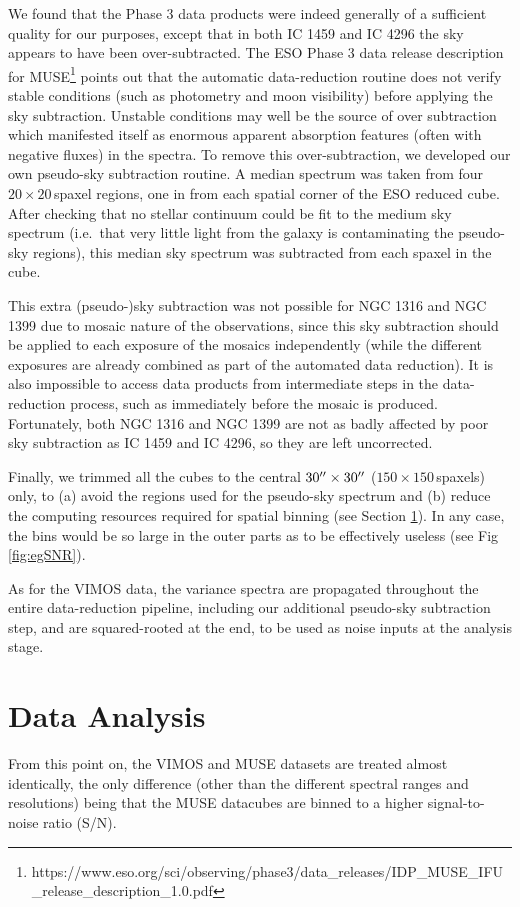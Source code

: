 		We found that the Phase 3 data products were indeed generally of a sufficient quality for our purposes, except that in both IC 1459 and IC 4296 the sky appears to have been over-subtracted. The ESO Phase 3 data release description for MUSE\footnote{https://www.eso.org/sci/observing/phase3/data_releases/IDP_MUSE_IFU_release_description_1.0.pdf} points out that the automatic data-reduction routine does not verify stable conditions (such as photometry and moon visibility) before applying the sky subtraction. Unstable conditions may well be the source of over subtraction which manifested itself as enormous apparent absorption features (often with negative fluxes) in the spectra. To remove this over-subtraction, we developed our own pseudo-sky subtraction routine. A median spectrum was taken from four $20 \times 20$\,spaxel regions, one in from each spatial corner of the ESO reduced cube. After checking that no stellar continuum could be fit to the medium sky spectrum (i.e.\ that very little light from the galaxy is contaminating the pseudo-sky regions), this median sky spectrum was subtracted from each spaxel in the cube. 

		This extra (pseudo-)sky subtraction was not possible for NGC 1316 and NGC 1399 due to mosaic nature of the observations, since this sky subtraction should be applied to each exposure of the mosaics independently (while the different exposures are already combined as part of the automated data reduction). It is also impossible to access data products from intermediate steps in the data-reduction process, such as immediately before the mosaic is produced. Fortunately, both NGC 1316 and NGC 1399 are not as badly affected by poor sky subtraction as IC 1459 and IC 4296, so they are left uncorrected. 

		Finally, we trimmed all the cubes to the central $30\hbox{$^{\prime\prime}$} \times 30\hbox{$^{\prime\prime}$}$ ($150 \times 150$\,spaxels) only, to (a) avoid the regions used for the pseudo-sky spectrum and (b) reduce the computing resources required for spatial binning (see Section \ref{sec:analysis}). In any case, the bins would be so large in the outer parts as to be effectively useless (see Fig\,\ref{fig:egSNR}).

		As for the VIMOS data, the variance spectra are propagated throughout the entire data-reduction pipeline, including our additional pseudo-sky subtraction step, and are squared-rooted at the end, to be used as noise inputs at the analysis stage. 

\section{Data Analysis}
	\label{sec:analysis}
	From this point on, the VIMOS and MUSE datasets are treated almost identically, the only difference (other than the different spectral ranges and resolutions) being that the MUSE datacubes are binned to a higher signal-to-noise ratio (S/N).

